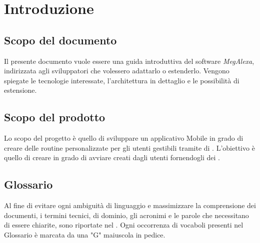 \chapter{Introduzione}
\label{Introduzione}
\section{Scopo del documento}
Il presente documento vuole essere una guida introduttiva del software \textit{MegAlexa}, indirizzata agli sviluppatori che volessero adattarlo o estenderlo. Vengono spiegate le tecnologie interessate, l'architettura in dettaglio e le possibilità di estensione. 

\section{Scopo del prodotto}
Lo scopo del progetto è quello di sviluppare un applicativo Mobile in grado di creare delle routine personalizzate per gli utenti 
gestibili tramite  di . L’obiettivo è quello di creare  in grado di avviare  creati dagli utenti fornendogli dei .

\section{Glossario}
Al fine di evitare ogni ambiguità di linguaggio e massimizzare la comprensione dei documenti, i termini tecnici, di dominio, gli acronimi e le parole che necessitano di essere chiarite, sono riportate nel \glossariodocumento.
Ogni occorrenza di vocaboli presenti nel Glossario è marcata da una "G" maiuscola in pedice.


